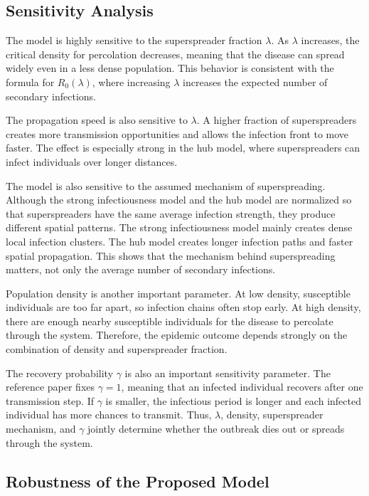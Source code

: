 \documentclass[11pt,a4paper]{article}
\begin{document}
\subsection{Sensitivity Analysis}

The model is highly sensitive to the superspreader fraction $\lambda$. As $\lambda$ increases, the critical density for percolation decreases, meaning that the disease can spread widely even in a less dense population. This behavior is consistent with the formula for $R_0(\lambda)$, where increasing $\lambda$ increases the expected number of secondary infections.

The propagation speed is also sensitive to $\lambda$. A higher fraction of superspreaders creates more transmission opportunities and allows the infection front to move faster. The effect is especially strong in the hub model, where superspreaders can infect individuals over longer distances.

The model is also sensitive to the assumed mechanism of superspreading. Although the strong infectiousness model and the hub model are normalized so that superspreaders have the same average infection strength, they produce different spatial patterns. The strong infectiousness model mainly creates dense local infection clusters. The hub model creates longer infection paths and faster spatial propagation. This shows that the mechanism behind superspreading matters, not only the average number of secondary infections.

Population density is another important parameter. At low density, susceptible individuals are too far apart, so infection chains often stop early. At high density, there are enough nearby susceptible individuals for the disease to percolate through the system. Therefore, the epidemic outcome depends strongly on the combination of density and superspreader fraction.

The recovery probability $\gamma$ is also an important sensitivity parameter. The reference paper fixes $\gamma=1$, meaning that an infected individual recovers after one transmission step. If $\gamma$ is smaller, the infectious period is longer and each infected individual has more chances to transmit. Thus, $\lambda$, density, superspreader mechanism, and $\gamma$ jointly determine whether the outbreak dies out or spreads through the system.

\subsection{Robustness of the Proposed Model}
\end{document}
